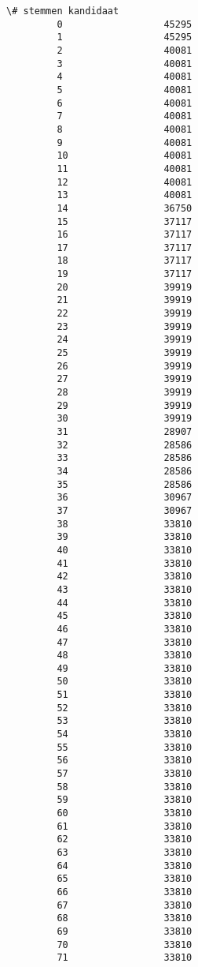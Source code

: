 \documentclass{article}
\begin{document}
\begin{Verbatim}[commandchars=\\\{\}]
              \# stemmen kandidaat  
         0                  45295  
         1                  45295  
         2                  40081  
         3                  40081  
         4                  40081  
         5                  40081  
         6                  40081  
         7                  40081  
         8                  40081  
         9                  40081  
         10                 40081  
         11                 40081  
         12                 40081  
         13                 40081  
         14                 36750  
         15                 37117  
         16                 37117  
         17                 37117  
         18                 37117  
         19                 37117  
         20                 39919  
         21                 39919  
         22                 39919  
         23                 39919  
         24                 39919  
         25                 39919  
         26                 39919  
         27                 39919  
         28                 39919  
         29                 39919  
         30                 39919  
         31                 28907  
         32                 28586  
         33                 28586  
         34                 28586  
         35                 28586  
         36                 30967  
         37                 30967  
         38                 33810  
         39                 33810  
         40                 33810  
         41                 33810  
         42                 33810  
         43                 33810  
         44                 33810  
         45                 33810  
         46                 33810  
         47                 33810  
         48                 33810  
         49                 33810  
         50                 33810  
         51                 33810  
         52                 33810  
         53                 33810  
         54                 33810  
         55                 33810  
         56                 33810  
         57                 33810  
         58                 33810  
         59                 33810  
         60                 33810  
         61                 33810  
         62                 33810  
         63                 33810  
         64                 33810  
         65                 33810  
         66                 33810  
         67                 33810  
         68                 33810  
         69                 33810  
         70                 33810  
         71                 33810  

\end{Verbatim}
\end{document}
